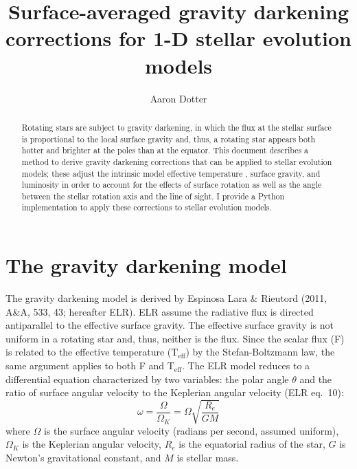 \documentclass[12pt]{article}
\newcommand{\Teff}{\mathrm{T_{eff}}}
\begin{document}
\title{Surface-averaged gravity darkening corrections for 1-D stellar evolution models}
\author{Aaron Dotter}

\maketitle

\begin{abstract}
Rotating stars are subject to gravity darkening, in which the flux
at the stellar surface is proportional to the local surface gravity and,
thus, a rotating star appears both hotter and brighter at the poles than
at the equator. This document describes a method to derive gravity
darkening corrections that can be applied to stellar evolution models;
these adjust the intrinsic model effective temperature , surface gravity, and luminosity
in order to account for the effects of surface rotation as well as the
angle between the stellar rotation axis and the line of sight. I provide
a Python implementation to apply these corrections to stellar evolution models.
\end{abstract}


\section{The gravity darkening model}
The gravity darkening model is derived by Espinosa Lara \& Rieutord (2011,
A\&A, 533, 43; hereafter ELR). ELR assume the radiative flux is directed
antiparallel to the effective surface gravity. The effective surface gravity
is not uniform in a rotating star and, thus, neither is the flux. Since the
scalar flux (F) is related to the effective temperature ($\Teff$) by the
Stefan-Boltzmann law, the same
argument applies to both F and $\Teff$. The ELR model reduces to a differential
equation characterized by two variables: the polar angle $\theta$ and the ratio
of surface angular velocity to the Keplerian angular velocity (ELR eq.\ 10):
\begin{equation}
  \omega = \frac{\Omega}{\Omega_K} = \Omega \sqrt{ \frac{R_e}{GM} }
\end{equation}
where $\Omega$ is the surface angular velocity (radians per second,
assumed uniform), $\Omega_K$ is the Keplerian angular velocity,
$R_e$ is the equatorial radius of the star, $G$ is Newton's gravitational constant,
and $M$ is stellar mass. 
\end{document}
